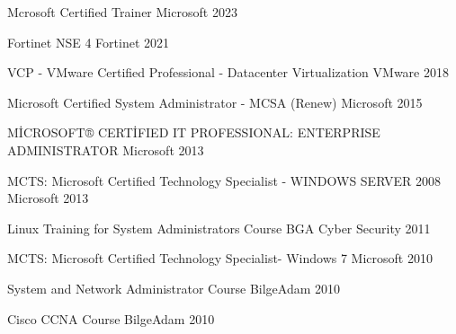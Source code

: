 
\begin{cvhonors}

  \cvhonor
    {Mcrosoft Certified Trainer} %
    {Microsoft} %
    {} %
    {2023} %

  \cvhonor
    {Fortinet NSE 4} %
    {Fortinet} %
    {} %
    {2021} %

  \cvhonor
    {VCP - VMware Certified Professional - Datacenter Virtualization} %
    {VMware} %
    {} %
    {2018} %

  \cvhonor
    {Microsoft Certified System Administrator - MCSA (Renew) } %
    {Microsoft} %
    {} %
    {2015} %

  \cvhonor
    {MİCROSOFT® CERTİFIED IT PROFESSIONAL: ENTERPRISE ADMINISTRATOR } %
    {Microsoft} %
    {} %
    {2013} %


  \cvhonor
    {MCTS: Microsoft Certified Technology Specialist - WINDOWS SERVER 2008 } %
    {Microsoft} %
    {} %
    {2013} %

 
  \cvhonor
    {Linux Training for System Administrators Course} %
    {BGA Cyber Security} %
    {} %
    {2011} %


   \cvhonor
    {MCTS: Microsoft Certified Technology Specialist- Windows 7} %
    {Microsoft} %
    {} %
    {2010} %


  \cvhonor
    {System and Network Administrator Course} %
    {BilgeAdam} %
    {} %
    {2010} %


\cvhonor
    {Cisco CCNA Course} %
    {BilgeAdam} %
    {} %
    {2010} %


\end{cvhonors}
